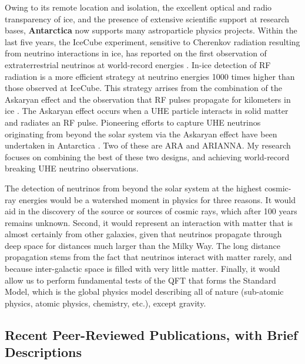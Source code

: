 \documentclass[../../main.tex]{subfiles}
\begin{document}
Owing to its remote location and isolation, the excellent optical and radio transparency of ice, and the presence of extensive scientific support at research bases, \textbf{Antarctica} now supports many astroparticle physics projects.  Within the last five years,  the IceCube experiment, sensitive to Cherenkov radiation resulting from neutrino interactions in ice, has reported on the first observation of extraterrestrial neutrinos at world-record energies \cite{Aartsen:2016xlq}.  In-ice detection of RF radiation is a more efficient strategy at neutrino energies 1000 times higher than those observed at IceCube. This strategy arrises from the combination of the Askaryan effect \cite{Askaryan:1962hbi,1962JPSJS..17C.257A,1965JETP...21..658A} and the observation that RF pulses propagate for kilometers in ice \cite{barrella_barwick_saltzberg_2011,barwick_besson_gorham_saltzberg_2005}.  The Askaryan effect occurs when a UHE particle interacts in solid matter and radiates an RF pulse.  Pioneering efforts to capture UHE neutrinos originating from beyond the solar system via the Askaryan effect have been undertaken in Antarctica \cite{Allison:2015eky,Barwick:2014pca,Gorham:2008dv,Kravchenko:2001id}.  Two of these are ARA and ARIANNA.  My research focuses on combining the best of these two designs, and achieving world-record breaking UHE neutrino observations. \\ \hspace{0.1cm}

The detection of neutrinos from beyond the solar system at the highest cosmic-ray energies would be a watershed moment in physics for three reasons.  It would aid in the discovery of the source or sources of cosmic rays, which after 100 years remains unknown.  Second, it would represent an interaction with matter that is almost certainly from other galaxies, given that neutrinos propagate through deep space for distances much larger than the Milky Way.  The long distance propagation stems from the fact that neutrinos interact with matter rarely, and because inter-galactic space is filled with very little matter.  Finally, it would allow us to perform fundamental tests of the QFT that forms the Standard Model, which is the global physics model describing all of nature (sub-atomic physics, atomic physics, chemistry, etc.), except gravity.

\subsection{Recent Peer-Reviewed Publications, with Brief Descriptions}
\end{document}
